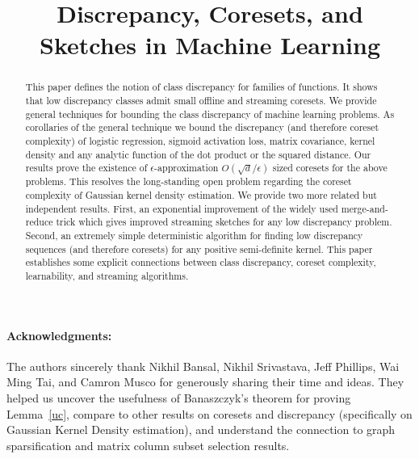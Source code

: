 \documentclass[12pt]{colt2019} %
\title[Discrepancy, Coresets, and Sketches in Machine Learning]{Discrepancy, Coresets, and Sketches in Machine Learning}
\newcommand{\eps}{\epsilon}
\begin{document}
\maketitle

\begin{abstract}
This paper defines the notion of class discrepancy for families of functions.  
It shows that low discrepancy classes admit small offline and streaming coresets. 
We provide general techniques for bounding the class discrepancy of machine learning problems. 
As corollaries of the general technique we bound the discrepancy (and therefore coreset complexity) of logistic regression, sigmoid activation loss, matrix covariance, kernel density and any analytic function of the dot product or the squared distance.
Our results prove the existence of $\eps$-approximation $O(\sqrt{d}/\eps)$ sized coresets for the above problems. 
This resolves the long-standing open problem regarding the coreset complexity of Gaussian kernel density estimation.  
We provide two more related but independent results. 
First, an exponential improvement of the widely used merge-and-reduce trick which gives improved streaming sketches for any low discrepancy problem.
Second, an extremely simple deterministic algorithm for finding low discrepancy sequences (and therefore coresets) for any positive semi-definite kernel. 
This paper establishes some explicit connections between class discrepancy, coreset complexity, learnability, and streaming algorithms. 
\end{abstract}

\paragraph{Acknowledgments:} The authors sincerely thank Nikhil Bansal, Nikhil Srivastava, Jeff Phillips, Wai Ming Tai, and Camron Musco 
for generously sharing their time and ideas.
They helped us uncover the usefulness of Banaszczyk's theorem for proving Lemma~\ref{uc}, compare to other results on coresets and discrepancy
(specifically on Gaussian Kernel Density estimation), and understand the connection to graph sparsification and matrix column subset selection results. 
\end{document}
